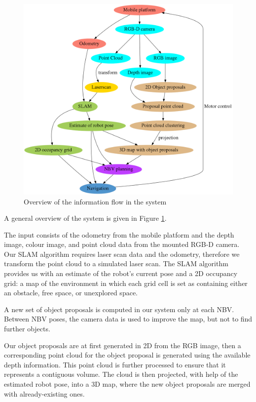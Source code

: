 \begin{figure}[ht]
	\begin{center}
		\includegraphics[width=0.85\linewidth]{dot/overview.png} 
		\caption{Overview of the information flow in the system}
		\label{fig:overview}
	\end{center}
\end{figure}

A general overview of the system is given in Figure \ref{fig:overview}.

The input consists of the odometry from the mobile platform and the depth image, colour image, and point cloud data from the mounted RGB-D camera.
Our SLAM algorithm requires laser scan data and the odometry, therefore we transform the point cloud to a simulated laser scan.
The SLAM algorithm provides us with an estimate of the robot's current pose and a 2D occupancy grid: a map of the environment in which each grid cell is set as containing either an obstacle, free space, or unexplored space. 

A new set of object proposals is computed in our system only at each NBV.
Between NBV poses, the camera data is used to improve the map, but not to find further objects.

Our object proposals are at first generated in 2D from the RGB image, then a corresponding point cloud for the object proposal is generated using the available depth information.
This point cloud is further processed to ensure that it represents a contiguous volume.
The cloud is then projected, with help of the estimated robot pose, into a 3D map, where the new object proposals are merged with already-existing ones.

